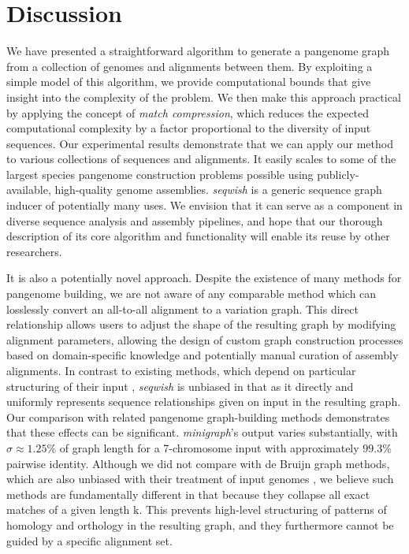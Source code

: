 \documentclass{bioinfo}
\theoremstyle{definition}
\begin{document}
\section{Discussion}
\label{sec:discussion}

We have presented a straightforward algorithm to generate a pangenome graph from a collection of genomes and alignments between them.
By exploiting a simple model of this algorithm, we provide computational bounds that give insight into the complexity of the problem.
We then make this approach practical by applying the concept of \textit{match compression}, which reduces the expected computational complexity by a factor proportional to the diversity of input sequences.
Our experimental results demonstrate that we can apply our method to various collections of sequences and alignments.
It easily scales to some of the largest species pangenome construction problems possible using publicly-available, high-quality genome assemblies.
\textit{seqwish} is a generic sequence graph inducer of potentially many uses.
We envision that it can serve as a component in diverse sequence analysis and assembly pipelines, and hope that our thorough description of its core algorithm and functionality will enable its reuse by other researchers.

It is also a potentially novel approach.
Despite the existence of many methods for pangenome building, we are not aware of any comparable method which can losslessly convert an all-to-all alignment to a variation graph.
This direct relationship allows users to adjust the shape of the resulting graph by modifying alignment parameters, allowing the design of custom graph construction processes based on domain-specific knowledge and potentially manual curation of assembly alignments.
In contrast to existing methods, which depend on particular structuring of their input \citep{Li:2020,Armstrong:2020}, \textit{seqwish} is unbiased in that as it directly and uniformly represents sequence relationships given on input in the resulting graph.
Our comparison with related pangenome graph-building methods demonstrates that these effects can be significant.
\textit{minigraph}'s output varies substantially, with $\sigma \approx 1.25\%$ of graph length for a 7-chromosome input with approximately $99.3\%$ pairwise identity.
Although we did not compare with de Bruijn graph methods, which are also unbiased with their treatment of input genomes \citep{Minkin_2016,Sheikhizadeh_2016,Yu_2021}, we believe such methods are fundamentally different in that because they collapse all exact matches of a given length k.
This prevents high-level structuring of patterns of homology and orthology in the resulting graph, and they furthermore cannot be guided by a specific alignment set.
\end{document}
